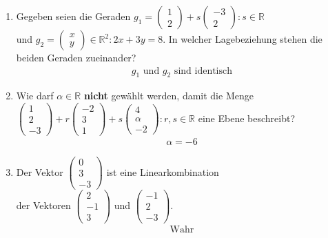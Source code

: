 \documentclass[12pt]{article}
\begin{document}
\begin{enumerate}[start=1,label={\bfseries Frage \arabic*:},leftmargin=1in]
    \item Gegeben seien die Geraden $g_1 = {\begin{pmatrix} 1 \\ 2 \end{pmatrix} + s \begin{pmatrix} -3 \\ 2 \end{pmatrix} : s \in \mathbb{R}}$ \\
          und $g_2 = {\begin{pmatrix} x \\ y \end{pmatrix} \in \mathbb{R}^2 : 2x + 3y = 8}$. 
          In welcher Lagebeziehung stehen die beiden Geraden zueinander?
    \begin{align*}
        g_1 \text{ und } g_2 \text{ sind identisch}
    \end{align*}

    \item Wie darf $\alpha \in \mathbb{R}$ \textbf{nicht} gewählt werden, damit die Menge \\ ${\begin{pmatrix} 1 \\ 2 \\ -3 \end{pmatrix}
          + r \begin{pmatrix} -2 \\ 3 \\ 1 \end{pmatrix} + s \begin{pmatrix} 4 \\ \alpha \\ -2 \end{pmatrix} : r , s \in \mathbb{R}}$
          eine Ebene beschreibt?
    \begin{align*}
        \alpha = -6
    \end{align*}

    \item Der Vektor $\begin{pmatrix} 0 \\ 3 \\ -3 \end{pmatrix}$ ist eine Linearkombination \\ der Vektoren
          $\begin{pmatrix} 2 \\ -1 \\ 3 \end{pmatrix}$ und $\begin{pmatrix} -1 \\ 2 \\ -3 \end{pmatrix}$.
    \begin{align*}
        \text{Wahr}
    \end{align*}


\end{enumerate}
\end{document}
